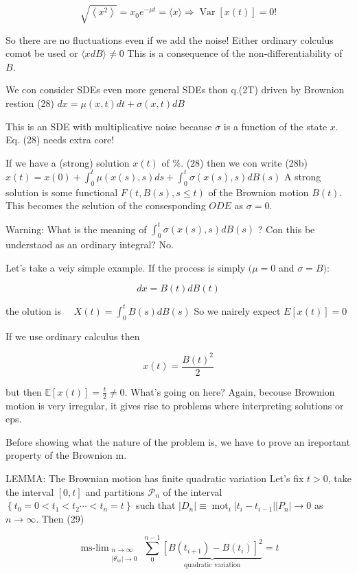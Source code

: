 $$
 \sqrt{\left\langle x^{2}\right\rangle}=x_{0} e^{-\mu t}=\langle x\rangle \Rightarrow \operatorname{Var}[x(t)]=0!
$$ 

So there are no fluctuations even if we add the noise! Either ordinary colculus comot be used or $\langle x d B\rangle \neq 0$ This is a consequence of the non-differentiability of $B$.

We con consider SDEs even more general SDEs thon q.(2T) driven by Brownion restion
(28) $d x=\mu(x, t) d t+\sigma(x, t) d B$

This is an SDE with multiplicative noise because $\sigma$ is a function of the state $x$. Eq. (28) needs extra core!

If we have a (strong) solution $x(t)$ of $\%$. (28) then we con write
(28b) $x(t)=x(0)+\int_{0}^{t} \mu(x(s), s) d s+\int_{0}^{t} \sigma(x(s), s) d B(s)$
A strong solution is some functional $F(t, B(s), s \leq t)$ of the Brownion motion $B(t)$. This becomes the selution of the consesponding $O D E$ as $\sigma=0$.

Warning:
What is the meaning of $\int_{0}^{t} \sigma(x(s), s) d B(s)$ ? Con this be understaod as an ordinary integral? No.

Let's take a veiy simple example. If the process is simply $(\mu=0$ and $\sigma=B)$:

$$
 d x=B(t) d B(t)
$$ 

the olution is $\quad X(t)=\int_{0}^{t} B(s) d B(s)$
So we nairely expect $E[x(t)]=0$

If we use ordinary calculus then

$$
 x(t)=\frac{B(t)^{2}}{2}
$$ 

but then $\mathbb{E}[x(t)]=\frac{t}{2} \neq 0$. What's going on here?
Again, becouse Brownion motion is very irregular, it gives rise to problems where interpreting solutions or eps.

Before showing what the nature of the problem is, we have to prove an ireportant property of the Brownion m.

LEMMA: The Brownian motion has finite quadratic variation Let's fix $t>0$, take the interval $[0, t]$ and partitions $\mathcal{P}_{n}$ of the interval $\left\{t_{0}=0<t_{1}<t_{2} \cdots<t_{n}=t\right\}$ such that $\left|D_{n}\right| \equiv \operatorname{mot}_{i}\left|t_{i}-t_{i-1}\right| \left|P_{n}\right| \rightarrow 0$ as $n \rightarrow \infty$. Then
(29)

$$
 \operatorname{ms-lim}_{\substack{n \rightarrow \infty \\\left|\theta_{m}\right| \rightarrow 0}} \sum_{0}^{n-1} \underbrace{\left[B\left(t_{i+1}\right)-B\left(t_{i}\right)\right]^{2}}_{\text{quadratic variation}}=t
$$ 


